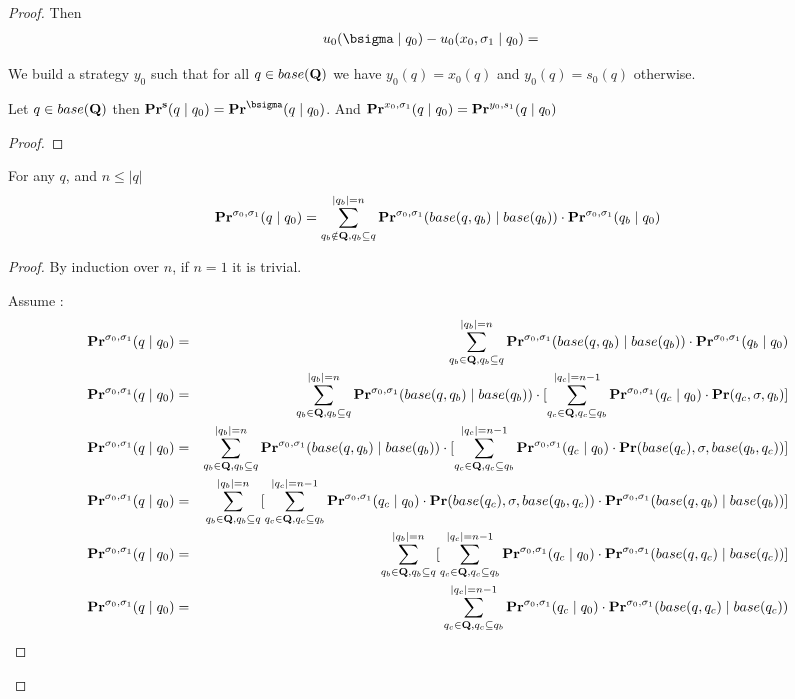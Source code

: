 \begin{proof}
Then 	\begin{eqnarray*}
	u_0(\bsigma \mid q_0) - u_0(x_0,\sigma_1 \mid q_0) &=& 
\end{eqnarray*}

	We build a strategy $y_0$ such that for all $q \in base(\mathbf{Q})$ we have $y_0(q) = x_0(q)$ and $y_0(q) = s_0(q)$ otherwise.
\begin{mylem}
	Let $q \in base(\mathbf{Q})$ then  $\pr^{\bs}(q \mid q_0) = \pr^{\bsigma}(q \mid q_0)$. And $\mathbf{Pr}^{x_0,\sigma_1}(q \mid q_0) = \mathbf{Pr}^{y_0,s_1}(q \mid q_0)$
\end{mylem}
\begin{proof}
\end{proof}
	
		\begin{mylem}
		For any $q$, and $n \leq |q|$
		$$\mathbf{Pr}^{\sigma_0,\sigma_1}(q \mid q_0) = \sum_{q_b \notin \mathbf{Q}, q_b \subseteq q}^{|q_b| = n} \mathbf{Pr}^{\sigma_0,\sigma_1}(base(q,q_b) \mid base(q_b)) \cdot \mathbf{Pr}^{\sigma_0,\sigma_1}(q_b \mid q_0)$$
	\end{mylem}
	\begin{proof}
		By induction over $n$, if $n = 1$ it is trivial.
		
		Assume :
		\begin{eqnarray*}
			\mathbf{Pr}^{\sigma_0,\sigma_1}(q \mid q_0) &=& \sum_{q_b \in \mathbf{Q}, q_b \subseteq q}^{|q_b| = n} \mathbf{Pr}^{\sigma_0,\sigma_1}(base(q,q_b) \mid base(q_b)) \cdot \mathbf{Pr}^{\sigma_0,\sigma_1}(q_b \mid q_0) \\
			\mathbf{Pr}^{\sigma_0,\sigma_1}(q \mid q_0) &=& \sum_{q_b \in \mathbf{Q}, q_b \subseteq q}^{|q_b| = n} \mathbf{Pr}^{\sigma_0,\sigma_1}(base(q,q_b) \mid base(q_b)) \cdot [ \sum_{q_c \in \mathbf{Q}, q_c \subseteq q_b}^{|q_c| = n-1}\mathbf{Pr}^{\sigma_0,\sigma_1}(q_c \mid q_0)\cdot \mathbf{Pr}(q_c, \sigma, q_b)]\\
			\mathbf{Pr}^{\sigma_0,\sigma_1}(q \mid q_0) &=& \sum_{q_b \in \mathbf{Q}, q_b \subseteq q}^{|q_b| = n} \mathbf{Pr}^{\sigma_0,\sigma_1}(base(q,q_b) \mid base(q_b)) \cdot [ \sum_{q_c \in \mathbf{Q}, q_c \subseteq q_b}^{|q_c| = n-1}\mathbf{Pr}^{\sigma_0,\sigma_1}(q_c \mid q_0)\cdot \mathbf{Pr}(base(q_c), \sigma, base(q_b,q_c))]\\
			\mathbf{Pr}^{\sigma_0,\sigma_1}(q \mid q_0) &=& \sum_{q_b \in \mathbf{Q}, q_b \subseteq q}^{|q_b| = n} [ \sum_{q_c \in \mathbf{Q}, q_c \subseteq q_b}^{|q_c| = n-1}\mathbf{Pr}^{\sigma_0,\sigma_1}(q_c \mid q_0)\cdot \mathbf{Pr}(base(q_c), \sigma, base(q_b,q_c)) \cdot \mathbf{Pr}^{\sigma_0,\sigma_1}(base(q,q_b) \mid base(q_b))]\\
			\mathbf{Pr}^{\sigma_0,\sigma_1}(q \mid q_0) &=& \sum_{q_b \in \mathbf{Q}, q_b \subseteq q}^{|q_b| = n} [ \sum_{q_c \in \mathbf{Q}, q_c \subseteq q_b}^{|q_c| = n-1}\mathbf{Pr}^{\sigma_0,\sigma_1}(q_c \mid q_0)\cdot  \mathbf{Pr}^{\sigma_0,\sigma_1}(base(q,q_c) \mid base(q_c))]\\
			\mathbf{Pr}^{\sigma_0,\sigma_1}(q \mid q_0) &=& 
			\sum_{q_c \in \mathbf{Q}, q_c \subseteq q_b}^{|q_c| = n-1}\mathbf{Pr}^{\sigma_0,\sigma_1}(q_c \mid q_0)\cdot  \mathbf{Pr}^{\sigma_0,\sigma_1}(base(q,q_c) \mid base(q_c)) \\
		\end{eqnarray*}
	\end{proof}


\end{proof}
